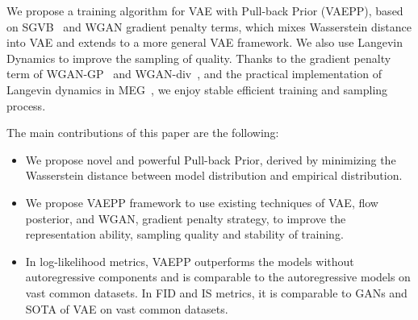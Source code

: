 We propose a training algorithm for VAE with Pull-back Prior (VAEPP), based on SGVB~\cite{kingma2014auto} and WGAN gradient penalty terms, which mixes Wasserstein distance into VAE and extends to a more general VAE framework. We also use Langevin Dynamics to improve the sampling of quality. 
Thanks to the gradient penalty term of WGAN-GP~\cite{gulrajani2017improved} and WGAN-div~\cite{wu2018wasserstein}, and the practical implementation of Langevin dynamics in MEG~\cite{kumar2019maximum}, we enjoy stable efficient training and sampling process. 

The main contributions of this paper are the following:
\begin{itemize}
	\item We propose novel and powerful Pull-back Prior, derived by minimizing the Wasserstein distance between model distribution and empirical distribution. 
	\item We propose VAEPP framework to use existing techniques of VAE, \EG flow posterior, and WGAN, \EG gradient penalty strategy, to improve the representation ability, sampling quality and stability of training. 
	\item In log-likelihood metrics, VAEPP outperforms the models without autoregressive components and is comparable to the autoregressive models on vast common datasets. In FID and IS metrics, it is comparable to GANs and SOTA of VAE on vast common datasets. 
\end{itemize}
